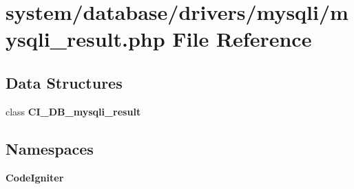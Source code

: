 \section{system/database/drivers/mysqli/mysqli\-\_\-result.php File Reference}
\label{mysqli__result_8php}
\subsection*{Data Structures}
\begin{DoxyCompactItemize}
\item 
class {\bf C\-I\-\_\-\-D\-B\-\_\-mysqli\-\_\-result}
\end{DoxyCompactItemize}
\subsection*{Namespaces}
\begin{DoxyCompactItemize}
\item 
{\bf Code\-Igniter}
\end{DoxyCompactItemize}
